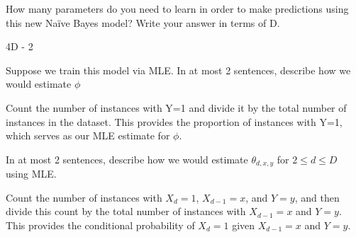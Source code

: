\documentclass[11pt,addpoints,answers]{exam}
\begin{document}
\begin{questions}
\begin{parts}
\begin{subparts}
\begin{your_solution}[height=8cm]
        \end{your_solution}
        

        \subpart[1] How many parameters do you need to learn in order to make predictions using this new Naïve Bayes model? Write your answer in terms of D.\\
        \begin{your_solution}[width = 4cm,height=2cm]
        4D - 2
    
        \end{your_solution}
        

        \subpart[2] Suppose we train this model via MLE. In at most 2 sentences, 
        describe how we would estimate $\phi$\\
        \begin{your_solution}[height=3cm]
        Count the number of instances with Y=1 and divide it by the total number of instances in the dataset. This provides the proportion of instances with Y=1, which serves as our MLE estimate for $\phi$.
    
        \end{your_solution}


        \subpart[2] In at most 2 sentences, describe how we would estimate $\theta_{d,x,y}$ for $2 \leq d \leq D$ using MLE.\\

        \begin{your_solution}[height=3cm]
        Count the number of instances with $X_d = 1$, $X_{d-1} = x$, and $Y = y$, and then divide this count by the total number of instances with $X_{d-1} = x$ and $Y = y$. This provides the conditional probability of $X_d = 1$ given $X_{d-1} = x$ and $Y = y$.
    
        \end{your_solution}


        

        
    \end{subparts}
    

 
    

\end{parts}
\end{questions}
\end{document}
